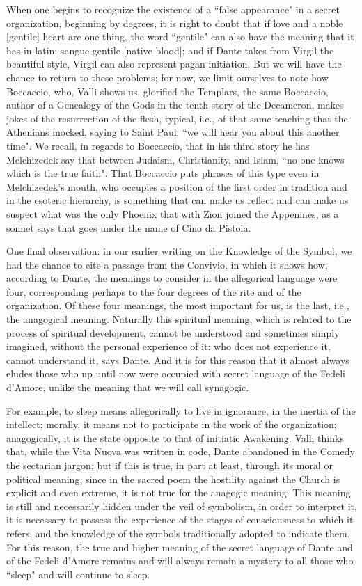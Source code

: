 When one begins to recognize the existence of a ``false appearance" in a secret organization, beginning by degrees, it is right to doubt that if love and a noble [gentile] heart are one thing, the word ``gentile" can also have the meaning that it has in latin: sangue gentile [native blood]; and if Dante takes from Virgil the beautiful style, Virgil can also represent pagan initiation. But we will have the chance to return to these problems; for now, we limit ourselves to note how Boccaccio, who, Valli shows us, glorified the Templars, the same Boccaccio, author of a Genealogy of the Gods in the tenth story of the Decameron, makes jokes of the resurrection of the flesh, typical, i.e., of that same teaching that the Athenians mocked, saying to Saint Paul: ``we will hear you about this another time". We recall, in regards to Boccaccio, that in his third story he has Melchizedek say that between Judaism, Christianity, and Islam, ``no one knows which is the true faith". That Boccaccio puts phrases of this type even in Melchizedek's mouth, who occupies a position of the first order in tradition and in the esoteric hierarchy, is something that can make us reflect and can make us suspect what was the only Phoenix that with Zion joined the Appenines, as a sonnet says that goes under the name of Cino da Pistoia.

One final observation: in our earlier writing on the Knowledge of the Symbol, we had the chance to cite a passage from the Convivio, in which it shows how, according to Dante, the meanings to consider in the allegorical language were four, corresponding perhaps to the four degrees of the rite and of the organization. Of these four meanings, the most important for us, is the last, i.e., the anagogical meaning. Naturally this spiritual meaning, which is related to the process of spiritual development, cannot be understood and sometimes simply imagined, without the personal experience of it: who does not experience it, cannot understand it, says Dante. And it is for this reason that it almost always eludes those who up until now were occupied with secret language of the Fedeli d'Amore, unlike the meaning that we will call synagogic.

For example, to sleep means allegorically to live in ignorance, in the inertia of the intellect; morally, it means not to participate in the work of the organization; anagogically, it is the state opposite to that of initiatic Awakening. Valli thinks that, while the Vita Nuova was written in code, Dante abandoned in the Comedy the sectarian jargon; but if this is true, in part at least, through its moral or political meaning, since in the sacred poem the hostility against the Church is explicit and even extreme, it is not true for the anagogic meaning. This meaning is still and necessarily hidden under the veil of symbolism, in order to interpret it, it is necessary to possess the experience of the stages of consciousness to which it refers, and the knowledge of the symbols traditionally adopted to indicate them. For this reason, the true and higher meaning of the secret language of Dante and of the Fedeli d'Amore remains and will always remain a mystery to all those who ``sleep" and will continue to sleep.


